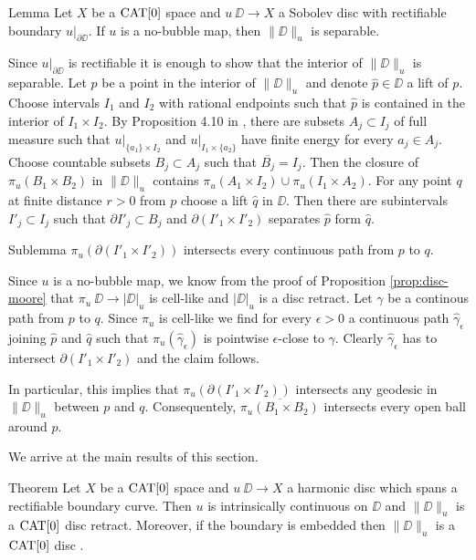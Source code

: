 \documentclass[a4paper,10pt]{amsart}
\begin{document}
\begin{thm}{Lemma}\label{lem:separable}
Let $X$ be a $\mathop{\rm CAT}\nolimits[0]$ space 
and $u\:\DD\to X$ a Sobolev disc with rectifiable boundary $u|_{\partial \DD}$.
If $u$ is a no-bubble map, then $\|\DD\|_u$ is separable.
\end{thm}

Since $u|_{\partial \DD}$ is rectifiable it is enough to show that 
the interior of $\|\DD\|_u$ is separable. Let $p$ be a point in the interior of $\|\DD\|_u$ and denote $\hat p\in\DD$ 
a lift of $p$. Choose intervals $I_1$ and $I_2$ with rational endpoints such that $\hat p$ is contained in the interior of $I_1\times I_2$.
By Proposition 4.10 in \cite{LW}, there are subsets $A_j\subset I_j$ of full measure such that $u|_{\{a_1\}\times I_2}$
and $u|_{I_1\times \{a_2\}}$ have finite energy for every $a_j\in A_j$. Choose countable subsets $B_j\subset A_j$
such that $\overline{B_j}=I_j$. Then the closure of $\pi_u(B_1\times B_2)$ in $\|\DD\|_u$ contains 
$\pi_u(A_1\times I_2)\cup \pi_u(I_1\times A_2)$.
For any point $q$ at finite distance $r>0$ from $p$ choose a lift $\hat q$ in $\DD$. Then there are subintervals $I'_j\subset I_j$
such that $\partial I'_j\subset B_j$ and $\partial( I'_1\times I'_2)$ separates $\hat p$ form $\hat q$.
\begin{thm}{Sublemma}\label{sublem:separating}
$\pi_u(\partial( I'_1\times I'_2))$ intersects every continuous path from $p$ to $q$.
\end{thm}

Since $u$ is a no-bubble map, we know from the proof of Proposition \ref{prop:disc-moore} that $\pi_u\:\DD\to|\DD|_u$ is cell-like and 
$|\DD|_u$ is a disc retract. 
Let $\gamma$ be a continous path from $p$ to $q$. Since $\pi_u$ is cell-like we find for every $\epsilon>0$ a continuous path $\hat\gamma_\epsilon$ joining $\hat p$
and $\hat q$ such that $\pi_u(\hat\gamma_\epsilon)$ is pointwise $\epsilon$-close to $\gamma$. Clearly $\hat\gamma_\epsilon$ has to intersect 
$\partial( I'_1\times I'_2)$ and the claim follows.
\qeds

In particular, this implies that $\pi_u(\partial( I'_1\times I'_2))$ intersects any geodesic in $\|\DD\|_u$ between $p$ and $q$. 
Consequentely, $\overline{\pi_u(B_1\times B_2)}$ intersects every open ball around $p$.
\qeds





We arrive at the main results of this section.


\begin{thm}{Theorem}\label{thm:harmonic}
Let $X$ be a $\mathop{\rm CAT}\nolimits[0]$ space 
and $u\:\DD\to X$ a harmonic disc which spans a rectifiable boundary curve. 
Then $u$ is intrinsically continuous on $\DD$ and $\|\DD\|_u$ is a $\mathop{\rm CAT}\nolimits[0]$ disc retract. 
Moreover, if the boundary is embedded then $\|\DD\|_u$ is a $\mathop{\rm CAT}\nolimits[0]$ disc .
\end{thm}
\end{document}
